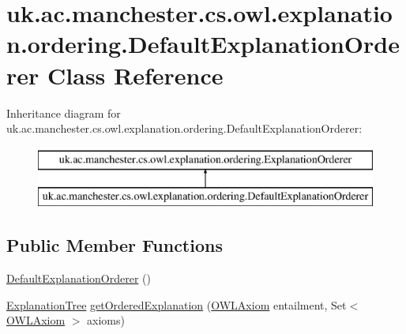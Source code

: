 \hypertarget{classuk_1_1ac_1_1manchester_1_1cs_1_1owl_1_1explanation_1_1ordering_1_1_default_explanation_orderer}{\section{uk.\-ac.\-manchester.\-cs.\-owl.\-explanation.\-ordering.\-Default\-Explanation\-Orderer Class Reference}
\label{classuk_1_1ac_1_1manchester_1_1cs_1_1owl_1_1explanation_1_1ordering_1_1_default_explanation_orderer}
}
Inheritance diagram for uk.\-ac.\-manchester.\-cs.\-owl.\-explanation.\-ordering.\-Default\-Explanation\-Orderer\-:\begin{figure}[H]
\begin{center}
\leavevmode
\includegraphics[height=2.000000cm]{classuk_1_1ac_1_1manchester_1_1cs_1_1owl_1_1explanation_1_1ordering_1_1_default_explanation_orderer}
\end{center}
\end{figure}
\subsection*{Public Member Functions}
\begin{DoxyCompactItemize}
\item 
\hyperlink{classuk_1_1ac_1_1manchester_1_1cs_1_1owl_1_1explanation_1_1ordering_1_1_default_explanation_orderer_ab8a7b541710a4e02e52d3153fbfb8447}{Default\-Explanation\-Orderer} ()
\item 
\hyperlink{classuk_1_1ac_1_1manchester_1_1cs_1_1owl_1_1explanation_1_1ordering_1_1_explanation_tree}{Explanation\-Tree} \hyperlink{classuk_1_1ac_1_1manchester_1_1cs_1_1owl_1_1explanation_1_1ordering_1_1_default_explanation_orderer_a636cbe4f299bc58056a9436653c851f8}{get\-Ordered\-Explanation} (\hyperlink{interfaceorg_1_1semanticweb_1_1owlapi_1_1model_1_1_o_w_l_axiom}{O\-W\-L\-Axiom} entailment, Set$<$ \hyperlink{interfaceorg_1_1semanticweb_1_1owlapi_1_1model_1_1_o_w_l_axiom}{O\-W\-L\-Axiom} $>$ axioms)
\end{DoxyCompactItemize}
